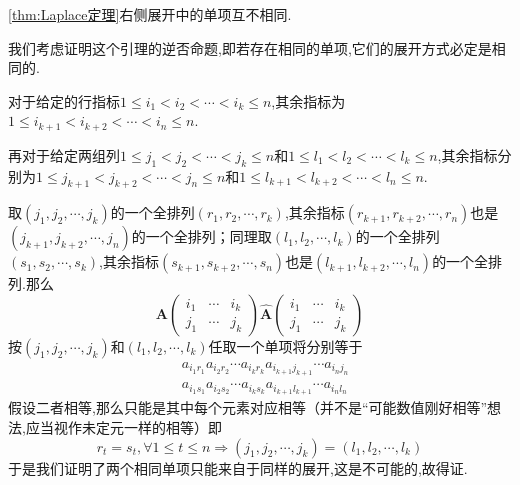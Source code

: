 \begin{green}
\begin{lemma}[单项不重复]\label{lem:单项不重复}
    \cref{thm:Laplace定理}右侧展开中的单项互不相同.
\end{lemma}
\begin{Proof}
我们考虑证明这个引理的逆否命题,即若存在相同的单项,它们的展开方式必定是相同的.

对于给定的行指标$1\leqslant i_1<i_2<\cdots <i_k\leqslant n$,其余指标为$1\leqslant i_{k+1}<i_{k+2}<\cdots<i_n\leqslant n.$

再对于给定两组列$1\leqslant j_1<j_2<\cdots<j_k\leqslant n$和$1\leqslant l_1<l_2<\cdots<l_k\leqslant n$,其余指标分别为$1\leqslant j_{k+1}<j_{k+2}<\cdots<j_n\leqslant n$和$1\leqslant l_{k+1}<l_{k+2}<\cdots<l_n\leqslant n.$

取$\left(j_1,j_2,\cdots,j_k\right)$的一个全排列$\left(r_1,r_2,\cdots,r_k\right)$,其余指标$\left(
    r_{k+1},r_{k+2},\cdots,r_n
\right)$也是$\left(
    j_{k+1},j_{k+2},\cdots,j_n
\right)$的一个全排列；同理取$\left(l_1,l_2,\cdots,l_k\right)$的一个全排列$\left(s_1,s_2,\cdots,s_k\right)$,其余指标$\left(
    s_{k+1},s_{k+2},\cdots,s_n
\right)$也是$\left(
    l_{k+1},l_{k+2},\cdots,l_n
\right)$的一个全排列.那么
\[
\bm{A}\begin{pmatrix}
    i_1 & \cdots & i_k \\
    j_1 & \cdots & j_k
\end{pmatrix} \widehat{\bm{A}}\begin{pmatrix}
    i_1 & \cdots & i_k \\
    j_1 & \cdots & j_k
\end{pmatrix} 
\]按$\left(
    j_1,j_2,\cdots,j_k
\right)$和$\left(
    l_1,l_2,\cdots,l_k
\right)$任取一个单项将分别等于
\begin{align*}
    &a_{i_1r_1}a_{i_2r_2}\cdots a_{i_kr_k}a_{i_{k+1}j_{k+1}}\cdots a_{i_nj_n}\\
    &a_{i_1s_1}a_{i_2s_2}\cdots a_{i_ks_k}a_{i_{k+1}l_{k+1}}\cdots a_{i_nl_n}
\end{align*}假设二者相等,那么只能是其中每个元素对应相等（并不是“可能数值刚好相等”想法,应当视作未定元一样的相等）即\[
r_t=s_t,\forall 1\leqslant t\leqslant n\Longrightarrow \left(
    j_1,j_2,\cdots,j_k
\right)=
\left(
    l_1,l_2,\cdots,l_k
\right)
\]于是我们证明了两个相同单项只能来自于同样的展开,这是不可能的,故得证.
\end{Proof}
\end{green}
